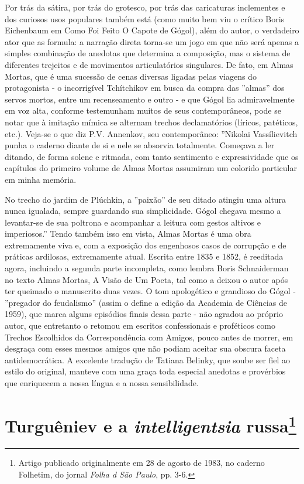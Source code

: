 Por trás da sátira, por trás do grotesco, por trás das caricaturas
inclementes e dos curiosos usos populares também está (como muito bem
viu o crítico Boris Eichenbaum em Como Foi Feito O Capote de Gógol),
além do autor, o verdadeiro ator que as formula: a narração direta
torna-se um jogo em que não será apenas a simples combinação de anedotas
que determina a composição, mas o sistema de diferentes trejeitos e de
movimentos articulatórios singulares. De fato, em Almas Mortas, que é
uma sucessão de cenas diversas ligadas pelas viagens do protagonista - o
incorrigível Tchítchikov em busca da compra das ''almas'' dos servos
mortos, entre um recenseamento e outro - e que Gógol lia admiravelmente
em voz alta, conforme testemunham muitos de seus contemporâneos, pode se
notar que à imitação mímica se alternam trechos declamatórios (líricos,
patéticos, etc.). Veja-se o que diz P.V. Annenkov, seu contemporâneo:
''Nikolai Vassílievitch punha o caderno diante de si e nele se absorvia
totalmente. Começava a ler ditando, de forma solene e ritmada, com tanto
sentimento e expressividade que os capítulos do primeiro volume de Almas
Mortas assumiram um colorido particular em minha memória.

No trecho do jardim de Plúchkin, a ''paixão'' de seu ditado atingiu uma
altura nunca igualada, sempre guardando sua simplicidade. Gógol chegava
mesmo a levantar-se de sua poltrona e acompanhar a leitura com gestos
altivos e imperiosos.'' Tendo também isso em vista, Almas Mortas é uma
obra extremamente viva e, com a exposição dos engenhosos casos de
corrupção e de práticas ardilosas, extremamente atual. Escrita entre
1835 e 1852, é reeditada agora, incluindo a segunda parte incompleta,
como lembra Boris Schnaiderman no texto Almas Mortas, A Visão de Um
Poeta, tal como a deixou o autor após ter queimado o manuscrito duas
vezes. O tom apologético e grandioso do Gógol - ''pregador do
feudalismo'' (assim o define a edição da Academia de Ciências de 1959),
que marca alguns episódios finais dessa parte - não agradou ao próprio
autor, que entretanto o retomou em escritos confessionais e proféticos
como Trechos Escolhidos da Correspondência com Amigos, pouco antes de
morrer, em desgraça com esses mesmos amigos que não podiam aceitar sua
obscura faceta antidemocrática. A excelente tradução de Tatiana Belinky,
que soube ser fiel ao estilo do original, manteve com uma graça toda
especial anedotas e provérbios que enriquecem a nossa língua e a nossa
sensibilidade.

\chapter{Turguêniev e a \emph{intelligentsia} russa\footnote{Artigo
  publicado originalmente em 28 de agosto de 1983, no caderno Folhetim,
  do jornal \emph{Folha d São Paulo}, pp. 3-6.}}

